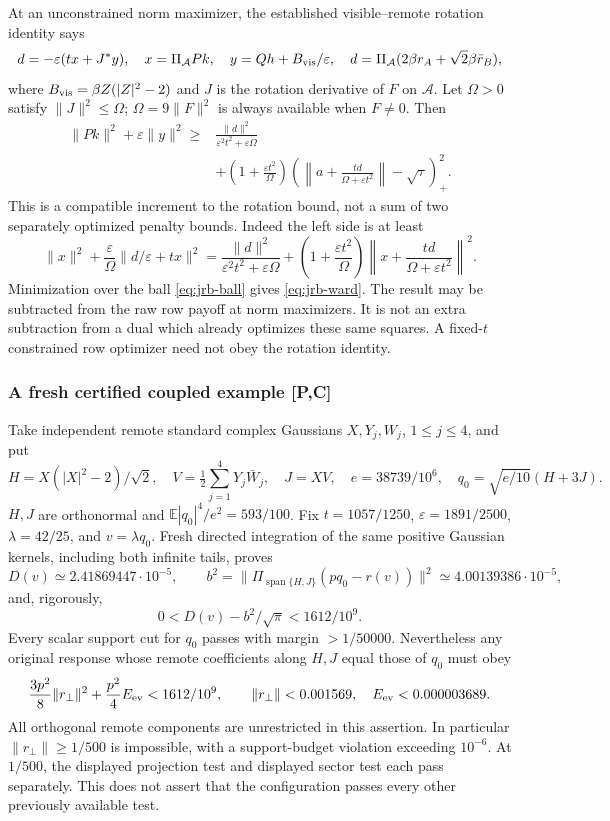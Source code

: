 At an unconstrained norm maximizer, the established visible--remote
rotation identity says
\[
 d=-\varepsilon(t x+J^*y),\quad
 x=\Pi_{\mathcal A}Pk,\quad y=Qh+B_{\rm vis}/\varepsilon,\quad
 d=\Pi_{\mathcal A}(2\beta r_A+\sqrt2\beta\bar r_B),
\]
where $B_{\rm vis}=\beta Z(|Z|^2-2)$ and $J$ is the rotation derivative
of $F$ on $\mathcal A$. Let $\Omega>0$ satisfy $\|J\|^2\le\Omega$;
$\Omega=9\|F\|^2$ is always available when $F\ne0$. Then
\begin{equation}
 \boxed{\begin{aligned}\|Pk\|^2+\varepsilon\|y\|^2\ge{}&
 \frac{\|d\|^2}{\varepsilon^2t^2+\varepsilon\Omega}\\
 &+\left(1+\frac{\varepsilon t^2}{\Omega}\right)
 \left(\left\|a+\frac{td}{\Omega+\varepsilon t^2}\right\|
                    -\sqrt\tau\right)_+^2.
 \end{aligned}}
 \label{eq:jrb-ward}
\end{equation}
This is a compatible increment to the rotation bound, not a sum of two
separately optimized penalty bounds. Indeed the left side is at least
\[
 \|x\|^2+\frac{\varepsilon}{\Omega}\|d/\varepsilon+tx\|^2
 =\frac{\|d\|^2}{\varepsilon^2t^2+\varepsilon\Omega}
 +\left(1+\frac{\varepsilon t^2}{\Omega}\right)
       \left\|x+\frac{td}{\Omega+\varepsilon t^2}\right\|^2.
\]
Minimization over the ball \eqref{eq:jrb-ball} gives \eqref{eq:jrb-ward}.
The result may be subtracted from the raw row payoff at norm maximizers.
It is not an extra subtraction from a dual which already optimizes these
same squares. A fixed-$t$ constrained row optimizer need not obey the
rotation identity.

\subsubsection{A fresh certified coupled example [P,C]}
Take independent remote standard complex Gaussians $X,Y_j,W_j$, $1\le j\le4$,
and put
\[
 H=X(|X|^2-2)/\sqrt2,\quad V=\tfrac12\sum_{j=1}^4Y_j\bar W_j,
 \quad J=XV,\quad e=38739/10^6,\quad q_0=\sqrt{e/10}(H+3J).
\]
$H,J$ are orthonormal and $\mathbb E|q_0|^4/e^2=593/100$.
Fix $t=1057/1250$, $\varepsilon=1891/2500$, $\lambda=42/25$,
and $v=\lambda q_0$. Fresh directed integration of the same positive
Gaussian kernels, including both infinite tails, proves
\[
 D(v)\simeq2.41869447\cdot10^{-5},\qquad
 b^2=\|\Pi_{\operatorname{span}\{H,J\}}(pq_0-r(v))\|^2
       \simeq4.00139386\cdot10^{-5},
\]
and, rigorously,
\begin{equation}\label{eq:jrb-budget-number}
 0<D(v)-b^2/\sqrt\pi<1612/10^9.
\end{equation}
Every scalar support cut for $q_0$ passes with margin $>1/50000$.
Nevertheless any original response whose remote coefficients along
$H,J$ equal those of $q_0$ must obey
\[
 \frac{3p^2}{8}\|r_\perp\|^2+\frac{p^2}{4}E_{\rm ev}
       <1612/10^9,
 \qquad \|r_\perp\|<0.001569,\quad E_{\rm ev}<0.000003689.
\]
All orthogonal remote components are unrestricted in this assertion.
In particular $\|r_\perp\|\ge1/500$ is impossible, with a support-budget
violation exceeding $10^{-6}$. At $1/500$, the displayed projection test
and displayed sector test each pass separately. This does not assert
that the configuration passes every other previously available test.


